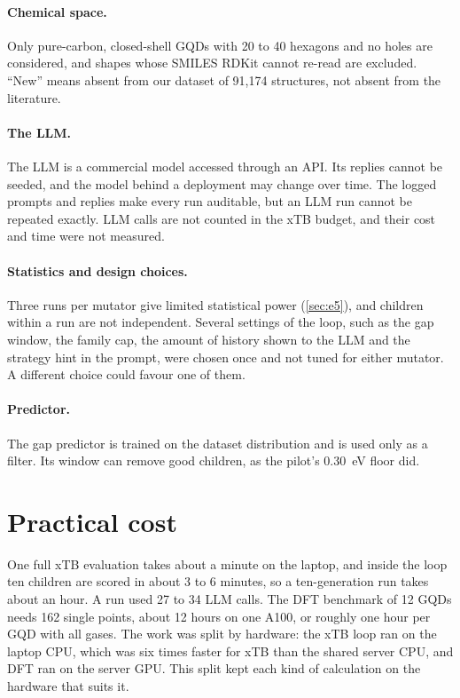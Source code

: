 \paragraph{Chemical space.} Only pure-carbon, closed-shell GQDs with 20 to 40 hexagons and no holes
are considered, and shapes whose SMILES RDKit cannot re-read are excluded. ``New'' means absent from
our dataset of 91{,}174 structures, not absent from the literature.

\paragraph{The LLM.} The LLM is a commercial model accessed through an API. Its replies cannot be
seeded, and the model behind a deployment may change over time. The logged prompts and replies make
every run auditable, but an LLM run cannot be repeated exactly. LLM calls are not counted in the xTB
budget, and their cost and time were not measured.

\paragraph{Statistics and design choices.} Three runs per mutator give limited statistical power
(\cref{sec:e5}), and children within a run are not independent. Several settings of the loop, such
as the gap window, the family cap, the amount of history shown to the LLM and the strategy hint in
the prompt, were chosen once and not tuned for either mutator. A different choice could favour one
of them.

\paragraph{Predictor.} The gap predictor is trained on the dataset distribution and is used only as
a filter. Its window can remove good children, as the pilot's 0.30~eV floor did.

\section{Practical cost}

One full xTB evaluation takes about a minute on the laptop, and inside the loop ten children are
scored in about 3 to 6 minutes, so a ten-generation run takes about an hour. A run used 27 to 34
LLM calls. The DFT benchmark of 12 GQDs needs 162 single points, about 12 hours on one A100, or
roughly one hour per GQD with all gases. The work was split by hardware: the xTB loop ran on the
laptop CPU, which was six times faster for xTB than the shared server CPU, and DFT ran on the
server GPU. This split kept each kind of calculation on the hardware that suits it.

